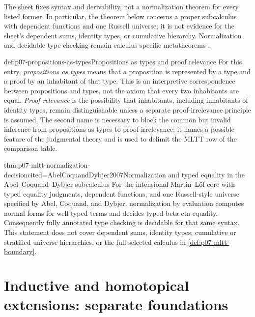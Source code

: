 The sheet fixes syntax and derivability, not a normalization theorem for every
listed former.  In particular, the theorem below concerns a proper subcalculus
with dependent functions and one Russell universe; it is not evidence for the
sheet's dependent sums, identity types, or cumulative hierarchy.  Normalization
and decidable type checking remain calculus-specific metatheorems
\cite{MartinLof1984,AbelCoquandDybjer2007}.

\begin{hbdefinition}{def:p07-propositions-as-types}{Propositions as types and proof relevance}
For this entry, \emph{propositions as types} means that a proposition is
represented by a type and a proof by an inhabitant of that type.  This is an
interpretive correspondence between propositions and types, not the axiom
that every two inhabitants are equal.  \emph{Proof relevance} is the
possibility that inhabitants, including inhabitants of identity types, remain
distinguishable unless a separate proof-irrelevance principle is assumed.
The second name is necessary to block the common but invalid inference from
propositions-as-types to proof irrelevance; it names a possible feature of
the judgmental theory and is used to delimit the MLTT row of the comparison
table.
\end{hbdefinition}

\begin{hbtheorem}{thm:p07-mltt-normalization-decision}{cited=AbelCoquandDybjer2007}{Normalization and typed equality in the Abel--Coquand--Dybjer subcalculus}
For the intensional Martin--L\"of core with typed equality judgments,
dependent functions, and one Russell-style universe specified by Abel,
Coquand, and Dybjer, normalization by evaluation computes normal forms for
well-typed terms and decides typed beta-eta equality.  Consequently fully
annotated type checking is decidable for that same syntax.  This statement
does not cover dependent sums, identity types, cumulative or stratified
universe hierarchies, or the full selected calculus in
\ref{def:p07-mltt-boundary}.
\end{hbtheorem}



\section{Inductive and homotopical extensions: separate foundations}

